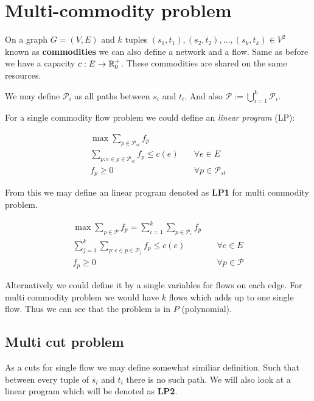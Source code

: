 \chapter{Multi-commodity problem}

On a graph $G = (V,E)$ and $k$ tuples $(s_{1}, t_{1}), (s_{2}, t_{2}), \dots, (s_{k}, t_{k}) \in V^{2}$ known as \textbf{commodities} we can also define a network and a flow. Same as before we have a capacity $c: E \to \mathbb{R}_{0}^{+}$. These commodities are shared on the same resources.

We may define $\mathcal{P}_{i}$ as all paths between $s_{i}$ and $t_{i}$. And also $\mathcal{P} := \bigcup_{i = 1}^{k} \mathcal{P}_{i}$.

For a single commodity flow problem we could define an \textit{linear program} (LP):

$$
\begin{aligned}
	\max \sum_{p \in \mathcal{P}_{st}} f_{p} \\
	\sum_{p: e \in p \in \mathcal{P}_{st}} f_{p} \leq c(e) &\quad \forall e \in E\\
	f_p \geq 0 &\quad \forall p \in \mathcal{P}_{st}
\end{aligned}
$$

From this we may define an linear program denoted as \textbf{LP1} for multi commodity problem.

$$
\begin{aligned}
	\max \sum_{p \in \mathcal{P}} f_{p} = \sum_{i = 1}^{k} \sum_{p \in \mathcal{P}_{i}} f_{p} \\
	\sum_{j = 1}^{k} \sum_{p: e \in p \in \mathcal{P}_{j}} f_{p} \leq c(e) & \quad \forall e \in E\\
	f_p \geq 0 & \quad \forall p \in \mathcal{P}
\end{aligned}
$$

Alternatively we could define it by a single variables for flows on each edge. For multi commodity problem we would have $k$ flows which adds up to one single flow. Thus we can see that the problem is in $P$ (polynomial).

\section{Multi cut problem}

As a cuts for single flow we may define somewhat similiar definition. Such that between every tuple of $s_{i}$ and $t_{i}$ there is no such path. We will also look at a linear program which will be denoted as \textbf{LP2}.

